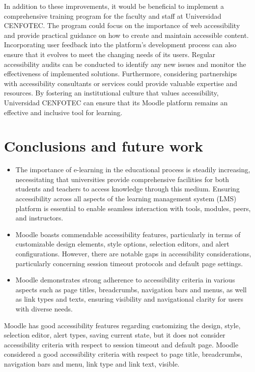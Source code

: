 \documentclass{IEEEtran}
\begin{document}
In addition to these improvements, it would be beneficial to implement a comprehensive training program for the faculty and staff at Universidad CENFOTEC. The program could focus on the importance of web accessibility and provide practical guidance on how to create and maintain accessible content. Incorporating user feedback into the platform's development process can also ensure that it evolves to meet the changing needs of its users. Regular accessibility audits can be conducted to identify any new issues and monitor the effectiveness of implemented solutions. Furthermore, considering partnerships with accessibility consultants or services could provide valuable expertise and resources. By fostering an institutional culture that values accessibility, Universidad CENFOTEC can ensure that its Moodle platform remains an effective and inclusive tool for learning.



\section{Conclusions and future work}
\begin{itemize}
    \item The importance of e-learning in the educational process is steadily increasing, necessitating that universities provide comprehensive facilities for both students and teachers to access knowledge through this medium. Ensuring accessibility across all aspects of the learning management system (LMS) platform is essential to enable seamless interaction with tools, modules, peers, and instructors.
    \item Moodle boasts commendable accessibility features, particularly in terms of customizable design elements, style options, selection editors, and alert configurations. However, there are notable gaps in accessibility considerations, particularly concerning session timeout protocols and default page settings.
    \item Moodle demonstrates strong adherence to accessibility criteria in various aspects such as page titles, breadcrumbs, navigation bars and menus, as well as link types and texts, ensuring visibility and navigational clarity for users with diverse needs.
\end{itemize}
Moodle has good accessibility features regarding customizing the design, style, selection editor, alert types, saving current state, but it does not consider accessibility criteria with respect to session timeout and default page.  
Moodle considered a good accessibility criteria with respect to page title, breadcrumbs, navigation bars and menu, link type and link text, visible.

\nocite{}



    
\end{document}
